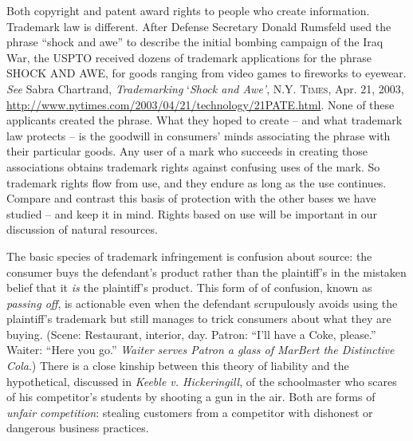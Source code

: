 \item Both copyright and patent award rights to people who create information.
Trademark law is different. After Defense Secretary Donald Rumsfeld used the
phrase ``shock and awe'' to describe the initial bombing campaign of the Iraq
War, the USPTO received dozens of trademark applications for the phrase SHOCK
AND AWE, for goods ranging from video games to fireworks to eyewear.
\textit{See} Sabra Chartrand,\textit{ Trademarking }{}`\textit{Shock and Awe'},
\textsc{N.Y. Times}, Apr. 21, 2003,
\url{http://www.nytimes.com/2003/04/21/technology/21PATE.html}. None of these
applicants created the phrase. What they hoped to create -- and what trademark
law protects -- is the goodwill in consumers' minds associating the phrase with
their particular goods. Any user of a mark who succeeds in creating those
associations obtains trademark rights against confusing uses of the mark. So
trademark rights flow from use, and they endure as long as the use continues.
Compare and contrast this basis of protection with the other bases we have
studied -- and keep it in mind. Rights based on use will be important in our
discussion of natural resources.


\item The basic species of trademark infringement is confusion about source: the
consumer buys the defendant's product rather than the plaintiff's in the
mistaken belief that it \textit{is} the plaintiff's product. This form of of
confusion, known as \textit{passing off}, is actionable even when the defendant
scrupulously avoids using the plaintiff's trademark but still manages to trick
consumers about what they are buying. (Scene: Restaurant, interior, day.
Patron: ``I'll have a Coke, please.'' Waiter: ``Here you go.'' \textit{Waiter
serves Patron a glass of MarBert the Distinctive Cola}.) There is a close
kinship between this theory of liability and the hypothetical, discussed in
\textit{Keeble v. Hickeringill}, of the schoolmaster who scares of his
competitor's students by shooting a gun in the air. Both are forms of
\textit{unfair competition}: stealing customers from a competitor with
dishonest or dangerous business practices.

